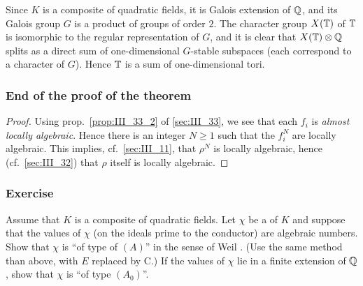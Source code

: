 Since $K$ is a composite of quadratic fields, it is Galois extension of $\mathbb{Q}$,
and its Galois group $G$ is a product of groups of order $2$. The character
group $X(\mathbb{T})$ of $\mathbb{T}$ is isomorphic to the 
\dpage 
regular representation of $G$, and it is clear that $X(\mathbb{T}) \otimes \mathbb{Q}$ splits
as a direct sum of one-dimensional $G$-stable subspaces (each correspond to a
character of $G$). Hence $\mathbb{T}$ is a sum of one-dimensional tori.

\subsubsection*{End of the proof of the theorem}

\begin{proof}
Using prop.~\ref{prop:III_33_2} of \ref{sec:III_33}, we see that each $f_i$ is \emph{almost
locally algebraic}. Hence there is an integer $N \geq 1$ such that the
$f_i^{N}$ are locally algebraic. This implies, cf.\ \ref{sec:III_11}, that
$\rho^N$ is locally algebraic, hence (cf.\ \ref{sec:III_32}) that $\rho$ itself
is locally algebraic. 
\end{proof}

\subsubsection*{Exercise}

Assume that $K$ is a composite of quadratic fields. Let $\chi$ be a
 of $K$ and suppose that the values of $\chi$ (on the
ideals prime to the conductor) are algebraic numbers. Show that $\chi$ is ``of
type of $(A)$'' in the sense of Weil \cite{41}. (Use the same method than above,
with $E$ replaced by C.) If the values of $\chi$ lie in a finite extension of
$\mathbb{Q}$, show that $\chi$ is ``of type $(A_0)$''.

